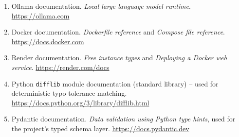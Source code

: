 \begin{enumerate}[leftmargin=1.4cm,itemsep=8pt]
  \item Ollama documentation. \textit{Local large language model runtime}. \url{https://ollama.com}
  \item Docker documentation. \textit{Dockerfile reference} and \textit{Compose file reference}. \url{https://docs.docker.com}
  \item Render documentation. \textit{Free instance types} and \textit{Deploying a Docker web service}. \url{https://render.com/docs}
  \item Python \texttt{difflib} module documentation (standard library) -- used for deterministic typo-tolerance matching. \url{https://docs.python.org/3/library/difflib.html}
  \item Pydantic documentation. \textit{Data validation using Python type hints}, used for the project's typed schema layer. \url{https://docs.pydantic.dev}
\end{enumerate}
